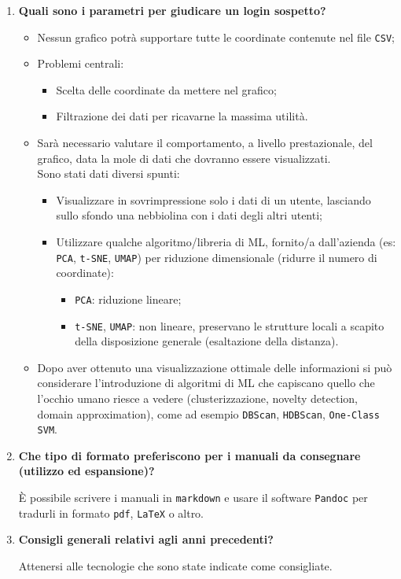 \documentclass[11pt]{article}
\begin{document}
\begin{enumerate}
			\item \textbf{Quali sono i parametri per giudicare un login sospetto?}
			\medskip
			\begin{itemize}
				\item Nessun grafico potrà supportare tutte le coordinate contenute nel file \texttt{CSV};
				\item Problemi centrali:
				\begin{itemize}
					\item Scelta delle coordinate da mettere nel grafico;
					\item Filtrazione dei dati per ricavarne la massima utilità.
				\end{itemize}
				\item Sarà necessario valutare il comportamento, a livello prestazionale, del grafico, data la mole di
				dati che dovranno essere visualizzati.\\
				Sono stati dati diversi spunti:
				\begin{itemize}
					\item Visualizzare in sovrimpressione solo i dati di un utente, lasciando sullo sfondo una
					nebbiolina con i dati degli altri utenti;
					\item Utilizzare qualche algoritmo/libreria di ML, fornito/a dall'azienda (es: \texttt{PCA}, \texttt{t-SNE},
					\texttt{UMAP}) per riduzione dimensionale (ridurre il numero di coordinate):
					\begin{itemize}
						\item \texttt{PCA}: riduzione lineare;
						\item \texttt{t-SNE}, \texttt{UMAP}: non lineare, preservano le strutture locali a scapito della
						disposizione generale (esaltazione della distanza).
					\end{itemize}
				\end{itemize}	
				\item Dopo aver ottenuto una visualizzazione ottimale delle informazioni si può considerare l'introduzione
				di algoritmi di ML che capiscano quello che l'occhio umano riesce a vedere (clusterizzazione, novelty detection,
				domain approximation), come ad esempio \texttt{DBScan}, \texttt{HDBScan}, \texttt{One-Class SVM}.
			\end{itemize}

			\bigskip
			
			\item \textbf{Che tipo di formato preferiscono per i manuali da consegnare (utilizzo ed espansione)?}
			
			\medskip
			
			È possibile scrivere i manuali in \texttt{markdown} e usare il software \texttt{Pandoc} per tradurli
			in formato \texttt{pdf}, \texttt{LaTeX} o altro.
			
			\bigskip
			
			\item \textbf{Consigli generali relativi agli anni precedenti?}
			
			\medskip
			
			Attenersi alle tecnologie che sono state indicate come consigliate.
			
		\end{enumerate}
\end{document}

